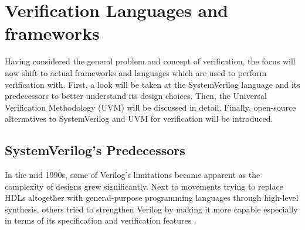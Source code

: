 \section{Verification Languages and frameworks} %

Having considered the general problem and concept of verification, the focus will now shift to actual frameworks and
languages which are used to perform verification with. First, a look will be taken at the SystemVerilog language and
its predecessors to better understand its design choices. Then, the Universal Verification Methodology (UVM) will be
discussed in detail. Finally, open-source alternatives to SystemVerilog and UVM for verification will be introduced.

\subsection{SystemVerilog's Predecessors} %

In the mid 1990s, some of Verilog's limitations became apparent as the complexity of designs grew significantly. Next
to movements trying to replace HDLs altogether with general-purpose programming languages through high-level
synthesis, others tried to strengthen Verilog by making it more capable especially in terms of its specification and
verification features \cite[Sec. 6]{flake2020a}.

